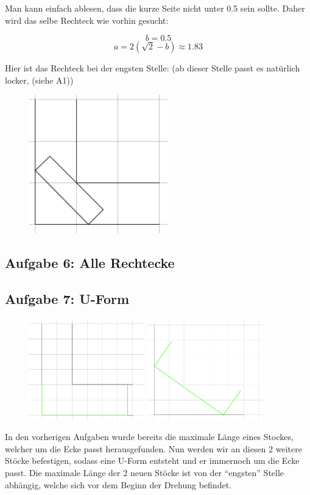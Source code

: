 \documentclass[a4paper,11pt]{article}
\begin{document}
Man kann einfach ablesen, dass die kurze Seite nicht unter 0.5 sein sollte. Daher wird das selbe Rechteck wie vorhin gesucht:

\[ b = 0.5 \]
\[ a = 2(\sqrt{2}-b) \approx 1.83 \]

Hier ist das Rechteck bei der engsten Stelle: (ab dieser Stelle passt es natürlich locker, (siehe A1))

\begin{figure}[H] 
        \centering
        \includegraphics[width=6cm]{img/A5_3.png}
\end{figure}

\subsection{Aufgabe 6: Alle Rechtecke}

\subsection{Aufgabe 7: U-Form}
\begin{figure}[H] 
        \centering
        \includegraphics[width=5cm]{img/A7_1.png}
        \includegraphics[width=5cm]{img/A7_2.png}
\end{figure}
In den vorherigen Aufgaben wurde bereits die maximale Länge eines Stockes, welcher um die Ecke passt herausgefunden. Nun werden wir an diesen 2 weitere Stöcke befestigen, sodass eine U-Form entsteht und er immernoch um die Ecke passt. Die maximale Länge der 2 neuen Stöcke ist von der “engsten” Stelle abhängig, welche sich vor dem Beginn der Drehung befindet.\\
\end{document}
